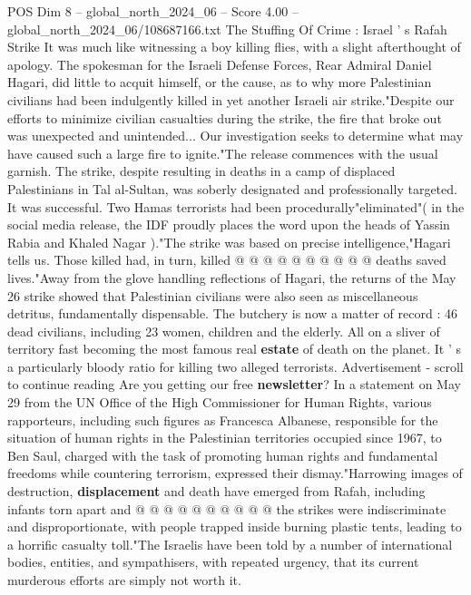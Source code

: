 \begin{textsample}{POS Dim 8 – global\_north\_2024\_06 – Score 4.00 – global\_north\_2024\_06/108687166.txt}  \label{ex:f8_pos_259}
The Stuffing Of Crime : Israel ' s Rafah Strike It was much like witnessing a boy killing flies, with a slight afterthought of apology.
The spokesman for the Israeli Defense Forces, Rear Admiral Daniel Hagari, did little to acquit himself, or the cause, as to why more Palestinian civilians had been indulgently killed in yet another Israeli air strike."Despite our efforts to minimize civilian casualties during the strike, the fire that broke out was unexpected and unintended...
Our investigation seeks to determine what may have caused such a large fire to ignite."The release commences with the usual garnish.
The strike, despite resulting in deaths in a camp of displaced Palestinians in Tal al-Sultan, was soberly designated and professionally targeted.
It was successful.
Two Hamas terrorists had been procedurally"eliminated"( in the social media release, the IDF proudly places the word upon the heads of Yassin Rabia and Khaled Nagar )."The strike was based on precise intelligence,"Hagari tells us.
Those killed had, in turn, killed @ @ @ @ @ @ @ @ @ @ deaths saved lives."Away from the glove handling reflections of Hagari, the returns of the May 26 strike showed that Palestinian civilians were also seen as miscellaneous detritus, fundamentally dispensable.
The butchery is now a matter of record : 46 dead civilians, including 23 women, children and the elderly.
All on a sliver of territory fast becoming the most famous real \textbf{estate} of death on the planet.
It ' s a particularly bloody ratio for killing two alleged terrorists.
Advertisement - scroll to continue reading Are you getting our free \textbf{newsletter}?
In a statement on May 29 from the UN Office of the High Commissioner for Human Rights, various rapporteurs, including such figures as Francesca Albanese, responsible for the situation of human rights in the Palestinian territories occupied since 1967, to Ben Saul, charged with the task of promoting human rights and fundamental freedoms while countering terrorism, expressed their dismay."Harrowing images of destruction, \textbf{displacement} and death have emerged from Rafah, including infants torn apart and @ @ @ @ @ @ @ @ @ @ the strikes were indiscriminate and disproportionate, with people trapped inside burning plastic tents, leading to a horrific casualty toll."The Israelis have been told by a number of international bodies, entities, and sympathisers, with repeated urgency, that its current murderous efforts are simply not worth it.

\end{textsample}
